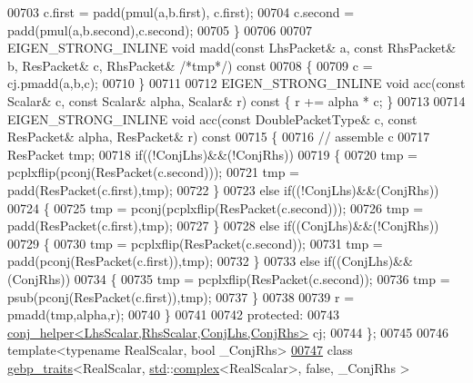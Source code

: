 \begin{DoxyCode}
00703     c.first   = padd(pmul(a,b.first), c.first);
00704     c.second  = padd(pmul(a,b.second),c.second);
00705   \}
00706 
00707   EIGEN\_STRONG\_INLINE \textcolor{keywordtype}{void} madd(\textcolor{keyword}{const} LhsPacket& a, \textcolor{keyword}{const} RhsPacket& b, ResPacket& c, RhsPacket& \textcolor{comment}{/*tmp*/})\textcolor{keyword}{
       const}
00708 \textcolor{keyword}{  }\{
00709     c = cj.pmadd(a,b,c);
00710   \}
00711   
00712   EIGEN\_STRONG\_INLINE \textcolor{keywordtype}{void} acc(\textcolor{keyword}{const} Scalar& c, \textcolor{keyword}{const} Scalar& alpha, Scalar& r)\textcolor{keyword}{ const }\{ r += alpha * c; \}
00713   
00714   EIGEN\_STRONG\_INLINE \textcolor{keywordtype}{void} acc(\textcolor{keyword}{const} DoublePacketType& c, \textcolor{keyword}{const} ResPacket& alpha, ResPacket& r)\textcolor{keyword}{ const}
00715 \textcolor{keyword}{  }\{
00716     \textcolor{comment}{// assemble c}
00717     ResPacket tmp;
00718     \textcolor{keywordflow}{if}((!ConjLhs)&&(!ConjRhs))
00719     \{
00720       tmp = pcplxflip(pconj(ResPacket(c.second)));
00721       tmp = padd(ResPacket(c.first),tmp);
00722     \}
00723     \textcolor{keywordflow}{else} \textcolor{keywordflow}{if}((!ConjLhs)&&(ConjRhs))
00724     \{
00725       tmp = pconj(pcplxflip(ResPacket(c.second)));
00726       tmp = padd(ResPacket(c.first),tmp);
00727     \}
00728     \textcolor{keywordflow}{else} \textcolor{keywordflow}{if}((ConjLhs)&&(!ConjRhs))
00729     \{
00730       tmp = pcplxflip(ResPacket(c.second));
00731       tmp = padd(pconj(ResPacket(c.first)),tmp);
00732     \}
00733     \textcolor{keywordflow}{else} \textcolor{keywordflow}{if}((ConjLhs)&&(ConjRhs))
00734     \{
00735       tmp = pcplxflip(ResPacket(c.second));
00736       tmp = psub(pconj(ResPacket(c.first)),tmp);
00737     \}
00738     
00739     r = pmadd(tmp,alpha,r);
00740   \}
00741 
00742 \textcolor{keyword}{protected}:
00743   \hyperlink{struct_eigen_1_1internal_1_1conj__helper}{conj\_helper<LhsScalar,RhsScalar,ConjLhs,ConjRhs>} cj;
00744 \};
00745 
00746 \textcolor{keyword}{template}<\textcolor{keyword}{typename} RealScalar, \textcolor{keywordtype}{bool} \_ConjRhs>
\hyperlink{class_eigen_1_1internal_1_1gebp__traits_3_01_real_scalar_00_01std_1_1complex_3_01_real_scalar_01f99740ceef5f07e0f3738974eb65d89c}{00747} \textcolor{keyword}{class }\hyperlink{class_eigen_1_1internal_1_1gebp__traits}{gebp\_traits}<RealScalar, \hyperlink{namespacestd}{std}::\hyperlink{structcomplex}{complex}<RealScalar>, false, \_ConjRhs >

\end{DoxyCode}
